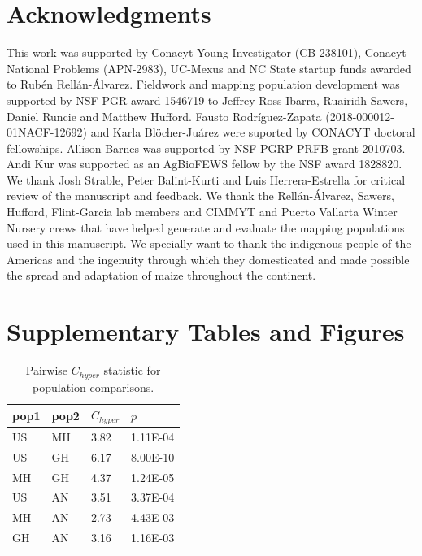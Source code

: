 \documentclass[9pt,twocolumn,twoside,lineno]{BioRxiv}
\begin{document}
\section{Acknowledgments}
This work was supported by Conacyt Young Investigator (CB-238101), Conacyt National Problems (APN-2983), UC-Mexus and NC State startup funds awarded to Rubén Rellán-Álvarez. 
Fieldwork and mapping population development was supported by NSF-PGR award 1546719 to Jeffrey Ross-Ibarra, Ruairidh Sawers, Daniel Runcie and Matthew Hufford.  
Fausto Rodríguez-Zapata (2018-000012-01NACF-12692) and Karla Blöcher-Juárez were suported by CONACYT doctoral fellowships.
Allison Barnes was supported by NSF-PGRP PRFB grant 2010703. 
Andi Kur was supported as an AgBioFEWS fellow by the NSF award 1828820.
We thank Josh Strable, Peter Balint-Kurti and Luis Herrera-Estrella for critical review of the manuscript and feedback. 
We thank the Rellán-Álvarez, Sawers, Hufford, Flint-Garcia lab members and CIMMYT and Puerto Vallarta Winter Nursery crews that have helped generate and evaluate the mapping populations used in this manuscript.
We specially want to thank the indigenous people of the Americas and the  ingenuity through which they domesticated and made possible the spread and adaptation of maize throughout the continent. 
\label{sec:acknowledgments}



\clearpage

\onecolumn

\section*{Supplementary Tables and Figures}

\begin{table}[h!]

\begin{tabular}{@{}llll@{}}
\toprule
pop1 & pop2 & $C_{hyper}$   & $p$  \\ \midrule
US   & MH   & 3.82 & 1.11E-04 \\
US   & GH   & 6.17 & 8.00E-10 \\
MH   & GH   & 4.37 & 1.24E-05 \\
US   & AN   & 3.51 & 3.37E-04 \\
MH   & AN   & 2.73 & 4.43E-03 \\
GH   & AN   & 3.16 & 1.16E-03 \\ \bottomrule
\end{tabular}
\label{tab:table1}
\caption{Pairwise $C_{hyper}$ statistic for population comparisons.}
\end{table}
\end{document}
